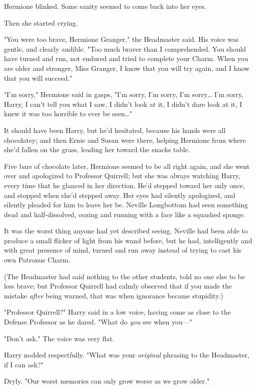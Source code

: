 Hermione blinked. Some sanity seemed to come back into her eyes.

Then she started crying.

"You were too brave, Hermione Granger," the Headmaster said. His voice was 
gentle, and clearly audible. "Too much braver than I comprehended. You should 
have turned and run, not endured and tried to complete your Charm. When you are 
older and stronger, Miss Granger, I know that you will try again, and I know 
that you will succeed."

"I'm sorry," Hermione said in gasps, "I'm sorry, I'm sorry, I'm sorry{\ldots} 
I'm sorry, Harry, I can't tell you what I saw, I didn't look at it, I didn't 
dare look at it, I knew it was too horrible to ever be seen{\ldots}"

It should have been Harry, but he'd hesitated, because his hands were all 
chocolatey; and then Ernie and Susan were there, helping Hermione from where 
she'd fallen on the grass, leading her toward the snacks table.

Five bars of chocolate later, Hermione seemed to be all right again, and she 
went over and apologized to Professor Quirrell; but she was always watching 
Harry, every time that he glanced in her direction. He'd stepped toward her 
only once, and stopped when she'd stepped away. Her eyes had silently 
apologized, and silently pleaded for him to leave her be.
\sbreak
Neville Longbottom had seen something dead and half-dissolved, oozing and 
running with a face like a squashed sponge.

It was the worst thing anyone had yet described seeing. Neville had been able 
to produce a small flicker of light from his wand before, but he had, 
intelligently and with great presence of mind, turned and run away instead of 
trying to cast his own Patronus Charm.

(The Headmaster had said nothing to the other students, told no one else to be 
less brave; but Professor Quirrell had calmly observed that if you made the 
mistake \emph{after} being warned, that was when ignorance became stupidity.)

"Professor Quirrell?" Harry said in a low voice, having come as close to the 
Defense Professor as he dared. "What do \emph{you} see when you---"

"Don't ask." The voice was very flat.

Harry nodded respectfully. "What was your \emph{original} phrasing to the 
Headmaster, if I can ask?"

Dryly. "Our worst memories can only grow worse as we grow older."


